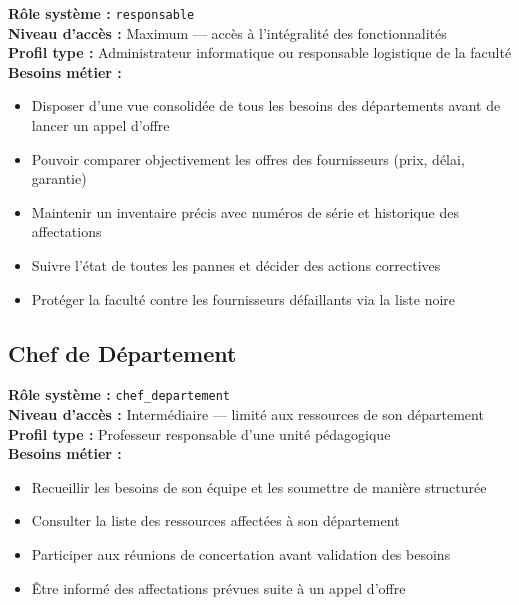 \documentclass[12pt,a4paper]{report}
\begin{document}
\begin{tcolorbox}[exigbox, title=Responsable des Ressources]
\textbf{Rôle système :} \texttt{responsable} \\
\textbf{Niveau d'accès :} Maximum — accès à l'intégralité des fonctionnalités \\
\textbf{Profil type :} Administrateur informatique ou responsable logistique de la faculté \\[6pt]
\textbf{Besoins métier :}
\begin{itemize}
    \item Disposer d'une vue consolidée de tous les besoins des départements avant de lancer un appel d'offre
    \item Pouvoir comparer objectivement les offres des fournisseurs (prix, délai, garantie)
    \item Maintenir un inventaire précis avec numéros de série et historique des affectations
    \item Suivre l'état de toutes les pannes et décider des actions correctives
    \item Protéger la faculté contre les fournisseurs défaillants via la liste noire
\end{itemize}
\end{tcolorbox}

\subsection{Chef de Département}

\begin{tcolorbox}[exigbox, title=Chef de Département]
\textbf{Rôle système :} \texttt{chef\_departement} \\
\textbf{Niveau d'accès :} Intermédiaire — limité aux ressources de son département \\
\textbf{Profil type :} Professeur responsable d'une unité pédagogique \\[6pt]
\textbf{Besoins métier :}
\begin{itemize}
    \item Recueillir les besoins de son équipe et les soumettre de manière structurée
    \item Consulter la liste des ressources affectées à son département
    \item Participer aux réunions de concertation avant validation des besoins
    \item Être informé des affectations prévues suite à un appel d'offre
\end{itemize}
\end{tcolorbox}
\end{document}
